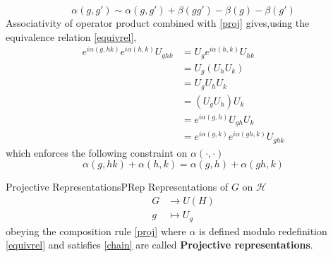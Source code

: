 \documentclass[11pt]{article}
\theoremstyle{definition}
\numberwithin{equation}{section}
\newcommand*\cH{\mathcal{H}}
\begin{document}
\begin{equation}\label{equivrel}
    \alpha(g,g') \sim \alpha(g,g') +\beta(gg') -\beta(g) - \beta(g')
\end{equation} 
Associativity of operator product combined with \eqref{proj} gives,using the equivalence relation \eqref{equivrel}, 
\begin{equation}
\begin{aligned}
    e^{i \alpha(g,hk)} e^{i \alpha(h,k)} U_{ghk}&=  U_g e^{i \alpha(h,k) } U_{hk}\\&= U_g (U_h U_k)\\
    &= U_{g} U_h U_k \\
    &= (U_g U_h) U_k\\
    &= e^{i \alpha(g,h)} U_{gh} U_k \\
    &= e^{i \alpha(g,k)} e^{i \alpha(gh,k)} U_{ghk}
    \end{aligned}
\end{equation}
which enforces the following constraint on $\alpha(\cdot, \cdot)$
\begin{equation}\label{chain}
    \alpha(g,hk) + \alpha(h,k) = \alpha(g,h) + \alpha(gh,k)
\end{equation}

\begin{defn}{Projective Representations}{PRep}
Representations of $G$ on $\cH$
    \begin{equation}
        \begin{aligned}
            G &\to U(H)\\
            g &\mapsto U_g
        \end{aligned}
    \end{equation}
obeying the composition rule \eqref{proj} where $\alpha$ is defined modulo redefinition \eqref{equivrel} and satisfies \eqref{chain} are called \textbf{Projective representations}.
\end{defn}
\end{document}
